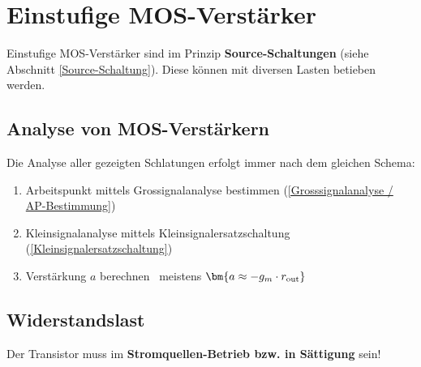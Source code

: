 \section{Einstufige MOS-Verstärker}

Einstufige MOS-Verstärker sind im Prinzip \textbf{Source-Schaltungen} (siehe Abschnitt \ref{Source-Schaltung}).
Diese können mit diversen Lasten betieben werden.


\subsection{Analyse von MOS-Verstärkern}

Die Analyse aller gezeigten Schlatungen erfolgt immer nach dem gleichen Schema:

\smallskip

\begin{enumerate}
    \item Arbeitspunkt mittels Grossignalanalyse bestimmen (\ref{Grosssignalanalyse / AP-Bestimmung})
    \item Kleinsignalanalyse mittels Kleinsignalersatzschaltung (\ref{Kleinsignalersatzschaltung})
    \item Verstärkung $a$ berechnen \textrightarrow\ meistens $\bm{a \approx - g_m \cdot r_{\rm out}}$
\end{enumerate}


\subsection{Widerstandslast}

Der Transistor muss im \textbf{Stromquellen-Betrieb bzw. in Sättigung} sein!

